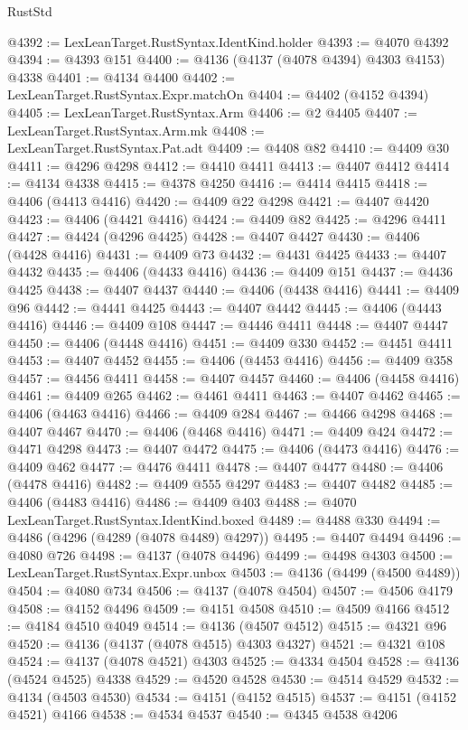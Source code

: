 \begin{lexlean}{RustStd}
\begin{coremodule}
{\begin{coremodule}
{{{{{{{{{{{{{{{{{{{{{{{{{{{{{{{{{{{{{{{{{{{{{{{{{{@4392 := LexLeanTarget.RustSyntax.IdentKind.holder
@4393 := @4070 @4392
@4394 := @4393 @151
@4400 := @4136 (@4137 (@4078 @4394) @4303 @4153) @4338
@4401 := @4134 @4400
@4402 := LexLeanTarget.RustSyntax.Expr.matchOn
@4404 := @4402 (@4152 @4394)
@4405 := LexLeanTarget.RustSyntax.Arm
@4406 := @2 @4405
@4407 := LexLeanTarget.RustSyntax.Arm.mk
@4408 := LexLeanTarget.RustSyntax.Pat.adt
@4409 := @4408 @82
@4410 := @4409 @30
@4411 := @4296 @4298
@4412 := @4410 @4411
@4413 := @4407 @4412
@4414 := @4134 @4338
@4415 := @4378 @4250
@4416 := @4414 @4415
@4418 := @4406 (@4413 @4416)
@4420 := @4409 @22 @4298
@4421 := @4407 @4420
@4423 := @4406 (@4421 @4416)
@4424 := @4409 @82
@4425 := @4296 @4411
@4427 := @4424 (@4296 @4425)
@4428 := @4407 @4427
@4430 := @4406 (@4428 @4416)
@4431 := @4409 @73
@4432 := @4431 @4425
@4433 := @4407 @4432
@4435 := @4406 (@4433 @4416)
@4436 := @4409 @151
@4437 := @4436 @4425
@4438 := @4407 @4437
@4440 := @4406 (@4438 @4416)
@4441 := @4409 @96
@4442 := @4441 @4425
@4443 := @4407 @4442
@4445 := @4406 (@4443 @4416)
@4446 := @4409 @108
@4447 := @4446 @4411
@4448 := @4407 @4447
@4450 := @4406 (@4448 @4416)
@4451 := @4409 @330
@4452 := @4451 @4411
@4453 := @4407 @4452
@4455 := @4406 (@4453 @4416)
@4456 := @4409 @358
@4457 := @4456 @4411
@4458 := @4407 @4457
@4460 := @4406 (@4458 @4416)
@4461 := @4409 @265
@4462 := @4461 @4411
@4463 := @4407 @4462
@4465 := @4406 (@4463 @4416)
@4466 := @4409 @284
@4467 := @4466 @4298
@4468 := @4407 @4467
@4470 := @4406 (@4468 @4416)
@4471 := @4409 @424
@4472 := @4471 @4298
@4473 := @4407 @4472
@4475 := @4406 (@4473 @4416)
@4476 := @4409 @462
@4477 := @4476 @4411
@4478 := @4407 @4477
@4480 := @4406 (@4478 @4416)
@4482 := @4409 @555 @4297
@4483 := @4407 @4482
@4485 := @4406 (@4483 @4416)
@4486 := @4409 @403
@4488 := @4070 LexLeanTarget.RustSyntax.IdentKind.boxed
@4489 := @4488 @330
@4494 := @4486 (@4296 (@4289 (@4078 @4489) @4297))
@4495 := @4407 @4494
@4496 := @4080 @726
@4498 := @4137 (@4078 @4496)
@4499 := @4498 @4303
@4500 := LexLeanTarget.RustSyntax.Expr.unbox
@4503 := @4136 (@4499 (@4500 @4489))
@4504 := @4080 @734
@4506 := @4137 (@4078 @4504)
@4507 := @4506 @4179
@4508 := @4152 @4496
@4509 := @4151 @4508
@4510 := @4509 @4166
@4512 := @4184 @4510 @4049
@4514 := @4136 (@4507 @4512)
@4515 := @4321 @96
@4520 := @4136 (@4137 (@4078 @4515) @4303 @4327)
@4521 := @4321 @108
@4524 := @4137 (@4078 @4521) @4303
@4525 := @4334 @4504
@4528 := @4136 (@4524 @4525) @4338
@4529 := @4520 @4528
@4530 := @4514 @4529
@4532 := @4134 (@4503 @4530)
@4534 := @4151 (@4152 @4515)
@4537 := @4151 (@4152 @4521) @4166
@4538 := @4534 @4537
@4540 := @4345 @4538 @4206
}}}}}}}}}}}}}}}}}}}}}}}}}}}}}}}}}}}}}}}}}}}}}}}}}}
\end{coremodule}}
\end{coremodule}
\end{lexlean}
